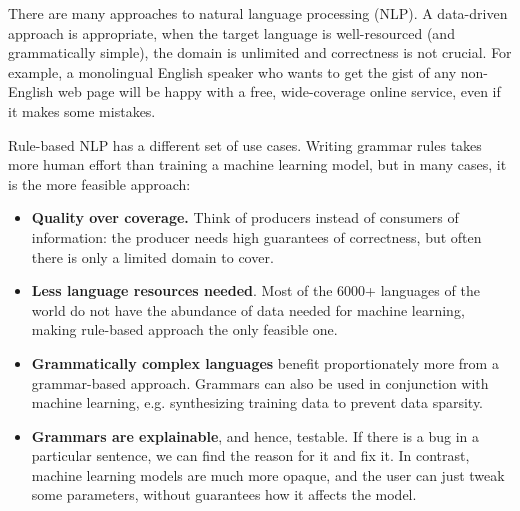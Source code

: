 \documentclass[conference]{IEEEtran}
\begin{document}
There are many approaches to natural language processing (NLP). 
A data-driven approach is appropriate, when the target language is well-resourced (and grammatically simple), the domain is unlimited and correctness is not crucial.
For example, a monolingual English speaker who wants to get the gist of any non-English web page will be happy with a free, wide-coverage online service, even if it makes some mistakes.

Rule-based NLP has a different set of use cases. Writing grammar rules takes more human effort than training a machine learning model, but in many cases, it is the more feasible approach:



\begin{itemize}
\item \textbf{Quality over coverage.} 
Think of producers instead of consumers of information: the producer needs high guarantees of correctness,
but often there is only a limited domain to cover. %

\item \textbf{Less language resources needed}. Most of the 6000+ languages of the world do not have the abundance of data needed for machine learning, making rule-based approach the only feasible one.

\item \textbf{Grammatically complex languages} benefit proportionately more from a grammar-based approach. 
Grammars can also be used in conjunction with machine learning, e.g. synthesizing training data to prevent data sparsity.

\item \textbf{Grammars are explainable}, and hence, testable. If there is a bug in a particular sentence, we can find the reason for it and fix it. In contrast, machine learning models are much more opaque, and the user can just tweak some parameters, without guarantees how it affects the model.

\end{itemize}
\end{document}
